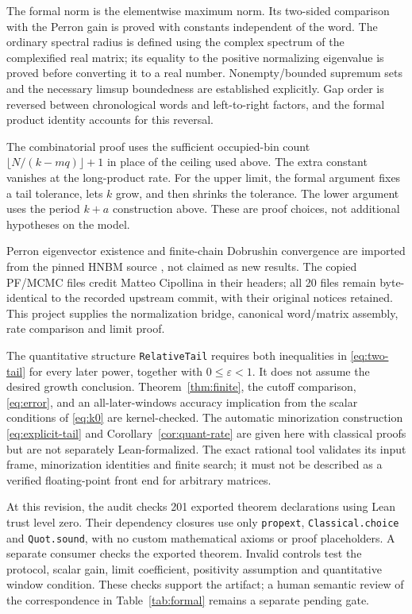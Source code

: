 \documentclass[11pt,letterpaper]{article}
\theoremstyle{remark}
\begin{document}
The formal norm is the elementwise maximum norm. Its two-sided comparison
with the Perron gain is proved with constants independent of the word.
The ordinary spectral radius is defined using the complex spectrum of the
complexified real matrix; its equality to the positive normalizing eigenvalue
is proved before converting it to a real number. Nonempty/bounded supremum
sets and the necessary limsup boundedness are established explicitly.
Gap order is reversed between chronological words and left-to-right factors,
and the formal product identity accounts for this reversal.

The combinatorial proof uses the sufficient occupied-bin count
$\lfloor N/(k-mq)\rfloor+1$ in place of the ceiling used above. The extra
constant vanishes at the long-product rate. For the upper limit, the formal
argument fixes a tail tolerance, lets $k$ grow, and then shrinks the tolerance.
The lower argument uses the period $k+a$ construction above. These are
proof choices, not additional hypotheses on the model.

Perron eigenvector existence and finite-chain Dobrushin convergence are
imported from the pinned HNBM source \cite{hnbm}, not claimed as new results.
The copied PF/MCMC files credit Matteo Cipollina in their headers; all
20 files remain byte-identical to the recorded upstream commit, with their
original notices retained. This project supplies the normalization bridge,
canonical word/matrix assembly, rate comparison and limit proof.

The quantitative structure \texttt{RelativeTail} requires both inequalities
in \eqref{eq:two-tail} for every later power, together with
$0\le\varepsilon<1$. It does not assume the desired growth conclusion.
Theorem~\ref{thm:finite}, the cutoff comparison, \eqref{eq:error}, and an
all-later-windows accuracy implication from the scalar conditions of
\eqref{eq:k0} are kernel-checked. The automatic minorization construction
\eqref{eq:explicit-tail} and Corollary~\ref{cor:quant-rate} are given here
with classical proofs but are not separately Lean-formalized. The exact
rational tool validates its input frame, minorization identities and
finite search; it must not be described as a verified floating-point
front end for arbitrary matrices.

At this revision, the audit checks 201 exported theorem declarations using
Lean trust level zero. Their dependency closures use only
\texttt{propext}, \texttt{Classical.choice} and \texttt{Quot.sound}, with
no custom mathematical axioms or proof placeholders. A separate consumer
checks the exported theorem. Invalid controls test the protocol, scalar
gain, limit coefficient, positivity assumption and quantitative window
condition. These checks support the artifact; a human semantic review of
the correspondence in Table~\ref{tab:formal} remains a separate pending gate.
\end{document}
